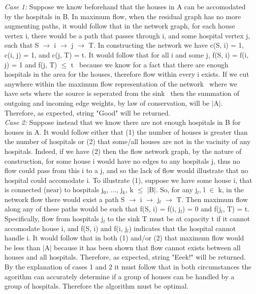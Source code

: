 \documentclass[10pt]{csc_assignment}
\begin{document}
\begin{description}
\emph{Case 1:} Suppose we know beforehand that the houses in A can be accomodated by the hospitals in B. In maximum flow, when the residual graph has no more augmenting paths, it would follow that in the network graph, for each house vertex i, there would be a path that passes through i, and some hospital vertex j, such that S $\rightarrow$ i $\rightarrow$ j $\rightarrow$ T. In constructing the network we have c(S, i) = 1, c(i, j) = 1, and c(j, T) = t. It would follow that for all i and some j, f(S, i) = f(i, j) = 1 and f(j, T) $\leqslant$ t \textemdash ~because we know for a fact that there are enough hospitals in the area for the houses, therefore flow within every i exists. If we cut anywhere within the maximum flow representation of the network \textemdash ~where we have sets where the source is seperated from the sink \textemdash ~then the summation of outgoing and incoming edge weights, by law of conservation, will be $\mid$A$\mid$. Therefore, as expected, string "Good" will be returned.\\    
\emph{Case 2:} Suppose instead that we know there are not enough hospitals in B for houses in A. It would follow either that (1) the number of houses is greater than the number of hospitals or (2) that some/all houses are not in the vacinity of any hospitals. Indeed, if we have (2) then the flow network graph, by the nature of construction, for some house i would have no edges to any hospitals j, thus no flow could pass from this i to a j, and so the lack of flow would illustrate that no hospital could accomodate i. To illustrate (1), suppose we have some house i, that is connected (near) to hospitals {j$_{0}$, ..., j$_{k}$}, k $\leqslant$ $\mid$B$\mid$. So, for any j$_{l}$, l $\in$ k, in the network flow there would exist a path S $\rightarrow$ i $\rightarrow$ j$_{l}$ $\rightarrow$ T. Then maximum flow along any of these paths would be such that f(S, i) = f(i, j$_{l}$) = 0 and f(j$_{l}$, T) = t. Specifically, flow from hospitals j$_{l}$ to the sink T must be at capacity t if it cannot accomodate house i, and f(S, i) and f(i, j$_{l}$) indicates that the hospital cannot handle i. It would follow that in both (1) and/or (2) that maximum flow would be less than $\mid$A$\mid$ because it has been shown that flow cannot exists between all houses and all hospitals. Therefore, as expected, string "Eeek!" will be returned.\\ 
By the explanation of cases 1 and 2 it must follow that in both circumstances the agorithm can accurately determine if a group of houses can be handled by a group of hospitals. Therefore the algorithm must be optimal.        
\\
    

\end{description}
\end{document}

